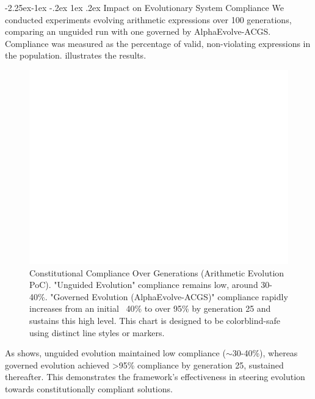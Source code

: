 \documentclass[manuscript,screen,review,anonymous,9pt]{acmart}
\makeatletter
\renewcommand\subsection{\@startsection{subsection}{2}{\z@}%
  {-2.25ex\@plus -1ex \@minus -.2ex}%
  {1ex \@plus .2ex}%
  {\normalfont\large\bfseries}}
\makeatother
\begin{document}
\subsection{Impact on Evolutionary System Compliance}
\label{subsec:impact_compliance}
We conducted experiments evolving arithmetic expressions over 100 generations, comparing an unguided run with one governed by AlphaEvolve-ACGS. Compliance was measured as the percentage of valid, non-violating expressions in the population.  illustrates the results.
\begin{figure}[htbp]
\centering
\includegraphics[width=\linewidth,keepaspectratio]{Figure_4_Constitutional_Compliance_Over_Generations.png} %
\caption[Constitutional compliance over generations line chart]{Constitutional Compliance Over Generations (Arithmetic Evolution PoC). "Unguided Evolution" compliance remains low, around 30-40\%. "Governed Evolution (AlphaEvolve-ACGS)" compliance rapidly increases from an initial ~40\% to over 95\% by generation 25 and sustains this high level. This chart is designed to be colorblind-safe using distinct line styles or markers.}
\label{fig:compliance_over_generations}
\end{figure}
As  shows, unguided evolution maintained low compliance ($\sim$30-40\%), whereas governed evolution achieved >95\% compliance by generation 25, sustained thereafter. This demonstrates the framework's effectiveness in steering evolution towards constitutionally compliant solutions.
\end{document}
